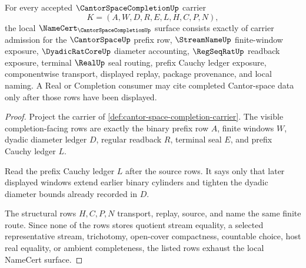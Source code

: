 \begin{theorem}
\label{thm:cantor-space-completion-namecert-obligations}
For every accepted $\CantorSpaceCompletionUp$ carrier
$$
K=(A,W,D,R,E,L,H,C,P,N),
$$
the local $\NameCert_{\CantorSpaceCompletionUp}$ surface consists exactly of carrier admission for the $\CantorSpaceUp$ prefix row, $\StreamNameUp$ finite-window exposure, $\DyadicRatCoreUp$ diameter accounting, $\RegSeqRatUp$ readback exposure, terminal $\RealUp$ seal routing, prefix Cauchy ledger exposure, componentwise transport, displayed replay, package provenance, and local naming. A Real or Completion consumer may cite completed Cantor-space data only after those rows have been displayed.
\end{theorem}
\begin{proof}
Project the carrier of \autoref{def:cantor-space-completion-carrier}. The visible completion-facing rows are exactly the binary prefix row $A$, finite windows $W$, dyadic diameter ledger $D$, regular readback $R$, terminal seal $E$, and prefix Cauchy ledger $L$.

Read the prefix Cauchy ledger $L$ after the source rows. It says only that later displayed windows extend earlier binary cylinders and tighten the dyadic diameter bounds already recorded in $D$.

The structural rows $H,C,P,N$ transport, replay, source, and name the same finite route. Since none of the rows stores quotient stream equality, a selected representative stream, trichotomy, open-cover compactness, countable choice, host real equality, or ambient completeness, the listed rows exhaust the local NameCert surface.
\end{proof}


